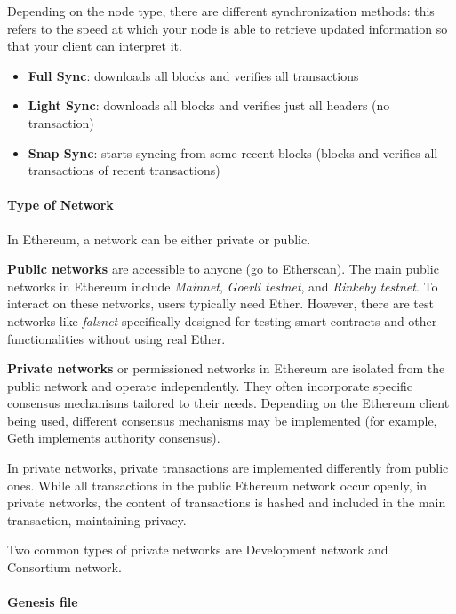 Depending on the node type, there are different synchronization methods: this refers to the speed at which your node is able to retrieve updated information so that your client can interpret it.

\begin{itemize}
    \item \textbf{Full Sync}: downloads all blocks and verifies all transactions
    \item \textbf{Light Sync}: downloads all blocks and verifies just all headers (no transaction)
    \item \textbf{Snap Sync}: starts syncing from some recent blocks (blocks and verifies all transactions of recent transactions)
\end{itemize}

\paragraph{Type of Network} In Ethereum, a network can be either private or public. 

\textbf{Public networks} are accessible to anyone (go to Etherscan). The main public networks in Ethereum include \textit{Mainnet}, \textit{Goerli testnet}, and \textit{Rinkeby testnet}. To interact on these networks, users typically need Ether. However, there are test networks like \textit{falsnet} specifically designed for testing smart contracts and other functionalities without using real Ether.

\textbf{Private networks} or permissioned networks in Ethereum are isolated from the public network and operate independently. They often incorporate specific consensus mechanisms tailored to their needs. Depending on the Ethereum client being used, different consensus mechanisms may be implemented (for example, Geth implements authority consensus).

In private networks, private transactions are implemented differently from public ones. While all transactions in the public Ethereum network occur openly, in private networks, the content of transactions is hashed and included in the main transaction, maintaining privacy.

Two common types of private networks are Development network and Consortium network.

\paragraph{Genesis file}


